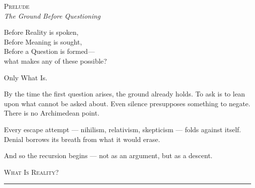 \documentclass[10pt, openany, oneside]{book}
\renewcommand{\huge}{\fontsize{17}{21}\selectfont}
\begin{document}
%
%
%

\newpage

\begin{center}
    {\huge\scshape Prelude}\\[0.8em]
    {\itshape The Ground Before Questioning}
\end{center}

\vspace{2em}


\noindent Before Reality is spoken,\\
Before Meaning is sought,\\
Before a Question is formed---\\
what makes any of these possible?

\vspace{0.5em}

Only What Is.

\vspace{1em}

\noindent By the time the first question arises, the ground already holds. To ask is to lean upon what cannot be asked about. Even silence presupposes something to negate. There is no Archimedean point.

\vspace{0.5em}

\noindent Every escape attempt --- nihilism, relativism, skepticism --- folds against itself. Denial borrows its breath from what it would erase.

\vspace{0.5em}

\noindent And so the recursion begins --- not as an argument, but as a descent.

\vspace{2em}

\begin{center}
    {\scshape What Is Reality?}\\[0.3em]
    \rule{0.2\textwidth}{0.3pt}
\end{center}

\vspace{1em}
\end{document}
